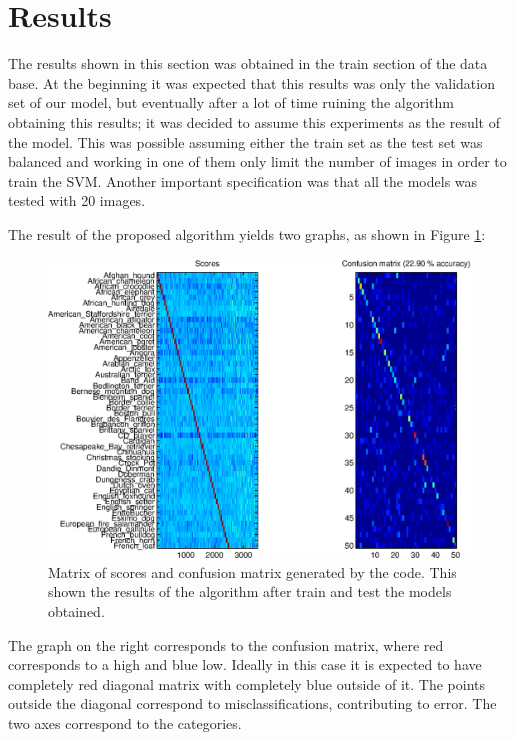 \documentclass[10pt,twocolumn,letterpaper]{article}
\begin{document}
\section{Results}

The results shown in this section was obtained in the train section of the data base. At the beginning it was expected that this results was only the validation set of our model, but eventually after a lot of time ruining the algorithm obtaining this results; it was decided to assume this experiments as the result of the model. This was possible assuming either the train set as the test set was balanced and working in one of them only limit the number of images in order to train the SVM. Another important specification was that all the models was tested with 20 images.

The result of the proposed algorithm yields two graphs, as shown in Figure \ref{baseline-result}:

\begin{figure}[h]
\begin{center}
\includegraphics[width=1\linewidth]{images/baseline-result.eps}
\end{center}
   \caption{
Matrix of scores and confusion matrix generated by the code. This shown  the results of the algorithm after train and test the models obtained.
   }
\label{baseline-result}
\end{figure}

The graph on the right corresponds to the confusion matrix, where red corresponds to a high and blue low. Ideally in this case it is expected to have completely red diagonal matrix with completely blue outside of  it. The points outside the diagonal correspond to misclassifications, contributing to error. The two axes correspond to the categories.
\end{document}
